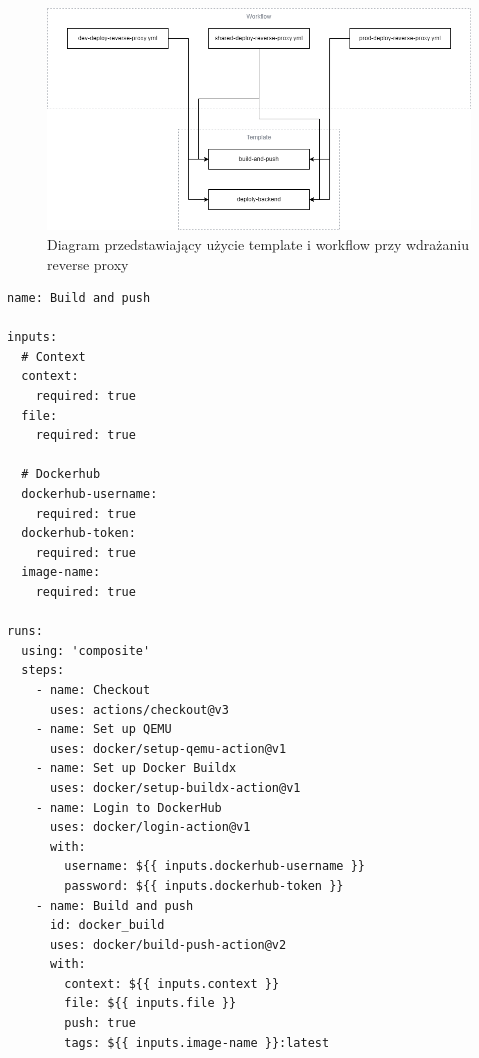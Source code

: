 \documentclass{article}
\begin{document}
\begin{figure}[H]
    \centering
    \includegraphics[width=1\linewidth]{reverseProxyTemplatesSchema.png}
    \caption{Diagram przedstawiający użycie template i workflow przy wdrażaniu reverse proxy}
    \label{fig:enter-label}
\end{figure}

\begin{lstlisting}[caption=Plik \texttt{.github/templates/build-and-push/action.yml}]
name: Build and push

inputs:
  # Context
  context:
    required: true
  file:
    required: true

  # Dockerhub
  dockerhub-username:
    required: true
  dockerhub-token:
    required: true
  image-name:
    required: true

runs:
  using: 'composite'
  steps:
    - name: Checkout
      uses: actions/checkout@v3
    - name: Set up QEMU
      uses: docker/setup-qemu-action@v1
    - name: Set up Docker Buildx
      uses: docker/setup-buildx-action@v1
    - name: Login to DockerHub
      uses: docker/login-action@v1
      with:
        username: ${{ inputs.dockerhub-username }}
        password: ${{ inputs.dockerhub-token }}
    - name: Build and push
      id: docker_build
      uses: docker/build-push-action@v2
      with:
        context: ${{ inputs.context }}
        file: ${{ inputs.file }}
        push: true
        tags: ${{ inputs.image-name }}:latest
\end{lstlisting}
\end{document}
